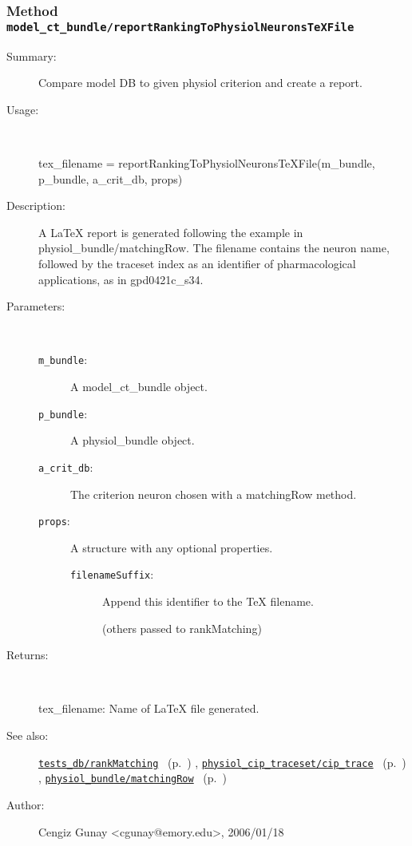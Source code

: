 \subsubsection[Method \texttt{reportRankingToPhysiolNeuronsTeXFile}]{Method \texttt{model\_ct\_bundle/reportRankingToPhysiolNeuronsTeXFile}}%
%
\label{ref_model_ct_bundle__reportRankingToPhysiolNeuronsTeXFile}%
\hypertarget{ref_model_ct_bundle__reportRankingToPhysiolNeuronsTeXFile}{}%
\begin{description}
\item[Summary:]Compare model DB to given physiol criterion and create a report.
%
\item[Usage:]~%
\begin{lyxcode}%
tex\_filename = reportRankingToPhysiolNeuronsTeXFile(m\_bundle, p\_bundle, a\_crit\_db, props)
%
\end{lyxcode}%
%
\item[Description:]%
A LaTeX report is generated 
 following the example in physiol\_bundle/matchingRow. The filename contains the neuron
 name, followed by the traceset index as an identifier of pharmacological applications,
 as in gpd0421c\_s34. 
\item[Parameters:]~
\begin{description}%
\item[\texttt{m\_bundle}:]
 A model\_ct\_bundle object.
\item[\texttt{p\_bundle}:]
 A physiol\_bundle object.
\item[\texttt{a\_crit\_db}:]
 The criterion neuron chosen with a matchingRow method.
\item[\texttt{props}:]
 A structure with any optional properties.
\begin{description}%
\item[\texttt{filenameSuffix}:]
 Append this identifier to the TeX filename.

(others passed to rankMatching)
\end{description}%
\end{description}%
%
\item[Returns: 
]~

	tex\_filename: Name of LaTeX file generated.
%
%
\item[See also:]%
\hyperlink{ref_tests_db__rankMatching}{\texttt{tests\_db/rankMatching}}%
\ (p.~\pageref{ref_tests_db__rankMatching})%
%
, \hyperlink{ref_physiol_cip_traceset__cip_trace}{\texttt{physiol\_cip\_traceset/cip\_trace}}%
\ (p.~\pageref{ref_physiol_cip_traceset__cip_trace})%
%
, \hyperlink{ref_physiol_bundle__matchingRow}{\texttt{physiol\_bundle/matchingRow}}%
\ (p.~\pageref{ref_physiol_bundle__matchingRow})%
%
%
\item[Author:]%
Cengiz Gunay <cgunay@emory.edu>, 2006/01/18
%
\end{description}
\methodline%
